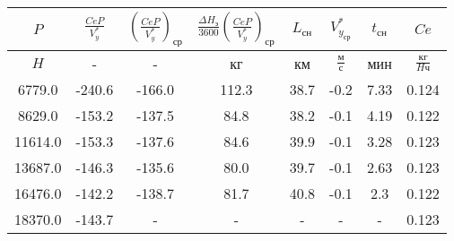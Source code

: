 \begin{tabular}{|c|c|c|c|c|c|c|c|}
\hline
$P$ & $\frac{CeP}{V_y^*}$ & $(\frac{CeP}{V_y^*})_{ср}$ & $\frac{\Delta H_э}{3600}(\frac{CeP}{V_y^*})_{ср}$ & $L_{сн}$ & $V_{y_{ср}}^*$ & $t_{сн}$ & $Ce$ \\ 
\hline
$H$ & - & - & кг & км & $\frac{м}{с}$ & мин & $\frac{кг}{H ч}$ \\ 
\hline
6779.0 & -240.6 & -166.0 & 112.3 & 38.7 & -0.2 & 7.33 & 0.124 \\ 
\hline
8629.0 & -153.2 & -137.5 & 84.8 & 38.2 & -0.1 & 4.19 & 0.122 \\ 
\hline
11614.0 & -153.3 & -137.6 & 84.6 & 39.9 & -0.1 & 3.28 & 0.123 \\ 
\hline
13687.0 & -146.3 & -135.6 & 80.0 & 39.7 & -0.1 & 2.63 & 0.123 \\ 
\hline
16476.0 & -142.2 & -138.7 & 81.7 & 40.8 & -0.1 & 2.3 & 0.122 \\ 
\hline
18370.0 & -143.7 & - & - & - & - & - & 0.123 \\ 
\hline
\end{tabular}